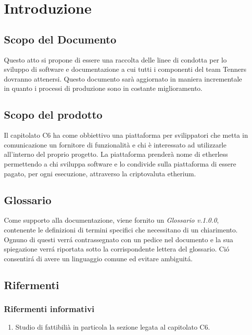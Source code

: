 \section{Introduzione}

\subsection{Scopo del Documento}
Questo atto si propone di essere una raccolta delle linee di condotta per lo
sviluppo di software e documentazione a cui tutti i componenti del team Tenners
dovranno attenersi.
Questo documento sar\`a aggiornato in maniera incrementale in quanto i processi
di produzione sono in costante miglioramento.

\subsection{Scopo del prodotto}
Il capitolato C6 ha come obbiettivo una piattaforma per svilippatori che metta
in comunicazione un fornitore di funzionalit\`a e chi \`e interessato ad utilizzarle
all'interno del proprio progetto.
La piattaforma prender\`a nome di etherless permettendo a chi sviluppa software e
lo condivide sulla piattaforma di essere pagato, per ogni esecuzione, attraverso
la criptovaluta etherium.


\subsection{Glossario}
Come supporto alla documentazione, viene fornito un \textit{Glossario v.1.0.0},
contenente le definizioni di termini specifici che necessitano di un chiarimento.
Ognuno di questi verr\'a contrassegnato con un pedice \glo nel documento e la sua
spiegazione verr\'a riportata sotto la corrispondente lettera del glossario. Ci\'o
consentir\'a di avere un linguaggio comune ed evitare ambiguit\'a.

\subsection{Rifermenti}
\subsubsection{Rifermenti informativi}
\begin{enumerate}
  \item Studio di fattibili\`a in particola la sezione legata al capitolato C6.
\end{enumerate}

